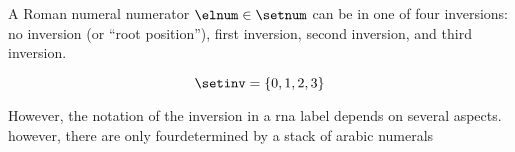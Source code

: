 
A Roman numeral numerator $\elnum \in \setnum$ can be in one
of four inversions: no inversion (or ``root position''),
first inversion, second inversion, and third inversion.

\begin{equation}
    \label{eq:inversion_vocabulary}
    \setinv = \{ 0, 1, 2, 3 \}
\end{equation}


However, the notation of the inversion in a \gls{rna} label
depends on several aspects. however, there are only
fourdetermined by a stack of arabic numerals


        
